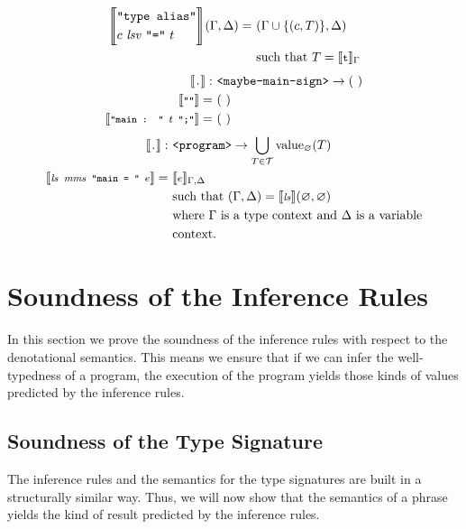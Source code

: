 \documentclass[]{scrbook}
\newcommand{\mf}[1]{\text{\texttt{#1}}}
\newcommand{\semantic}[1]{\llbracket \text{\footnotesize\texttt{#1}} \rrbracket}
\theoremstyle{definition}
\theoremstyle{definition}
\theoremstyle{definition}
\theoremstyle{remark}
\begin{document}
\[\begin{aligned}
\Bigg\llbracket\begin{aligned}
&\mf{"type } \mf{alias"} \\
& c \ \mathit{lsv} \ \mf{"="} \ t
\end{aligned}\Bigg\rrbracket(\Gamma,\Delta) =\ & (\Gamma\cup\{(c,T)\},\Delta) \\
& \text{such that } T = \semantic{t}_\Gamma
\end{aligned}
\] \[
\begin{aligned}
\semantic{.}:\ &\mf{<maybe-main-sign>}\to(\ )\\
\semantic{""} =\ & (\ )\\
\semantic{"main : " $t$ ";"} =\ & (\ )
\end{aligned}
\] \[
\begin{aligned}
\semantic{.}:\ &\mf{<program>}\to\bigcup_{T\in\mathcal{T}}\text{value}_\varnothing(T)\\
\semantic{$\mathit{ls} \ \mathit{mms}$ "main = " $e$} =\ & \semantic{$e$}_{\Gamma,\Delta}\\
    & \text{such that } (\Gamma,\Delta) = \semantic{$\mathit{ls}$}(\varnothing,\varnothing)\\
    & \text{where }  \Gamma \text{ is a type context and } \Delta \text{ is a variable}\\
    & \text{context.}
\end{aligned}
\]

\section{Soundness of the Inference
Rules}\label{soundness-of-the-inference-rules}

In this section we prove the soundness of the inference rules with
respect to the denotational semantics. This means we ensure that if we
can infer the well-typedness of a program, the execution of the program
yields those kinds of values predicted by the inference rules.

\subsection{Soundness of the Type
Signature}\label{soundness-of-the-type-signature}

The inference rules and the semantics for the type signatures are built
in a structurally similar way. Thus, we will now show that the semantics
of a phrase yields the kind of result predicted by the inference rules.
\end{document}
